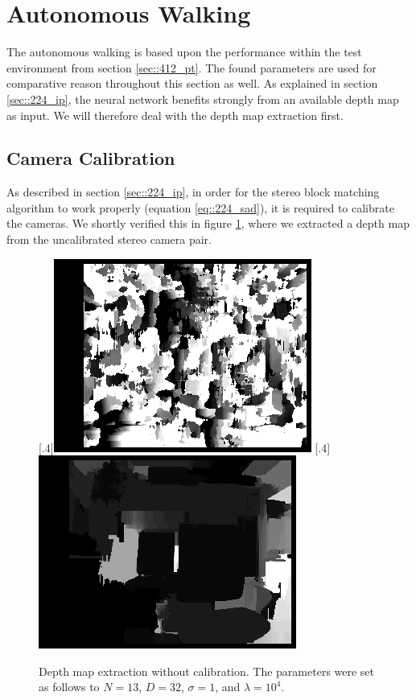 \section{Autonomous Walking}
\label{sec::42_aw}
The autonomous walking is based upon the performance within the test environment from section \ref{sec::412_pt}. The found parameters are used for comparative reason throughout this section as well. As explained in section \ref{sec::224_ip}, the neural network benefits strongly from an available depth map as input. We will therefore deal with the depth map extraction first.
\subsection{Camera Calibration}
\label{sec::421_cc}
As described in section \ref{sec::224_ip}, in order for the stereo block matching algorithm to work properly (equation \ref{eq::224_sad}), it is required to calibrate the cameras. We shortly verified this in figure \ref{fig::421_no_calib}, where we extracted a depth map from the uncalibrated stereo camera pair.
\begin{figure}[h!]
	\centering
	[.4\linewidth]{\includegraphics[scale=.3]{chapters/04_experiments/02_autonomous_walking/02_depth_map_parameter_tuning/disp_no_calib.png}}
	[.4\linewidth]{\includegraphics[scale=.3]{chapters/04_experiments/02_autonomous_walking/02_depth_map_parameter_tuning/wls_no_calib.png}}
	\caption{Depth map extraction without calibration. The parameters were set as follows to $N=13$, $D=32$, $\sigma = 1$, and $\lambda=10^4$.}
	\label{fig::421_no_calib}
\end{figure}
